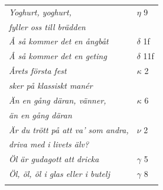 \documentclass[a6paper,10pt]{article}
\begin{document}
\newpage
\begin{table}[!]
\begin{tabular}{l l}
\textit{Yoghurt, yoghurt,}	&$\eta$ 9\\
\textit{fyller oss till brädden} &\\
\textit{Å så kommer det en ångbåt}	&$\delta$ 1f\\
\textit{Å så kommer det en geting}	&$\delta$ 11f\\
\textit{Årets första fest}	&$\kappa$ 2\\
\textit{sker på klassiskt manér} &\\
\textit{Än en gång däran, vänner,}	&$\kappa$ 6\\
\textit{än en gång däran} &\\
\textit{Är du trött på att va' som andra,}	&$\nu$ 2\\
\textit{driva med i livets älv?} &\\
\textit{Öl är gudagott att dricka}	&$\gamma$ 5\\
\textit{Öl, öl, öl i glas eller i butelj}	&$\gamma$ 8\\ 
\vspace{150pt}
\end{tabular}
\end{table}
\end{document}
